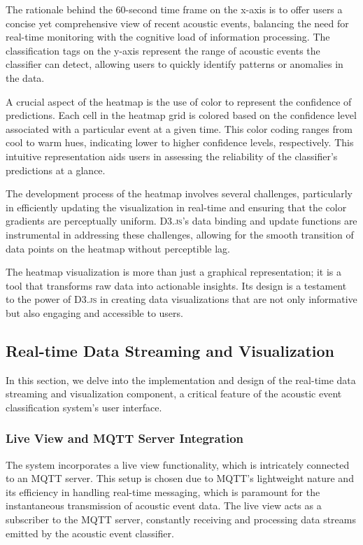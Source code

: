 The rationale behind the 60-second time frame on the x-axis is to offer users a concise yet comprehensive view of recent acoustic events, balancing the need for real-time monitoring with the cognitive load of information processing. The classification tags on the y-axis represent the range of acoustic events the classifier can detect, allowing users to quickly identify patterns or anomalies in the data.

A crucial aspect of the heatmap is the use of color to represent the confidence of predictions. Each cell in the heatmap grid is colored based on the confidence level associated with a particular event at a given time. This color coding ranges from cool to warm hues, indicating lower to higher confidence levels, respectively. This intuitive representation aids users in assessing the reliability of the classifier’s predictions at a glance.

The development process of the heatmap involves several challenges, particularly in efficiently updating the visualization in real-time and ensuring that the color gradients are perceptually uniform. \textsc{D3.js}'s data binding and update functions are instrumental in addressing these challenges, allowing for the smooth transition of data points on the heatmap without perceptible lag.

The heatmap visualization is more than just a graphical representation; it is a tool that transforms raw data into actionable insights. Its design is a testament to the power of \textsc{D3.js} in creating data visualizations that are not only informative but also engaging and accessible to users.

\subsection{Real-time Data Streaming and Visualization}
In this section, we delve into the implementation and design of the real-time data streaming and visualization component, a critical feature of the acoustic event classification system's user interface.

\subsubsection{Live View and MQTT Server Integration}
The system incorporates a live view functionality, which is intricately connected to an MQTT server. This setup is chosen due to MQTT's lightweight nature and its efficiency in handling real-time messaging, which is paramount for the instantaneous transmission of acoustic event data. The live view acts as a subscriber to the MQTT server, constantly receiving and processing data streams emitted by the acoustic event classifier.

